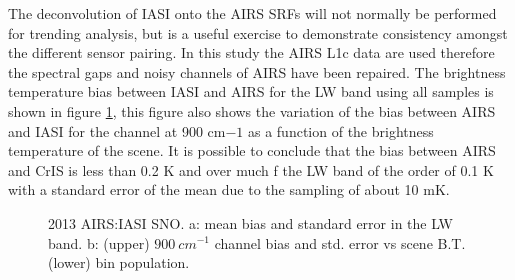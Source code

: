 \documentclass[twocolumn,10pt]{article}
\begin{document}
The deconvolution of IASI onto the AIRS SRFs will not normally be performed for trending analysis, but is a useful exercise to demonstrate consistency amongst the different sensor pairing. In this study the AIRS L1c data are used therefore the spectral gaps and noisy channels of AIRS have been repaired.
The brightness temperature bias between IASI and AIRS for the LW band using all samples is shown in figure \ref{fig:Z1}, this figure also shows the variation of the bias between AIRS and IASI for the channel at 900 cm${-1}$ as a function of the brightness temperature of the scene. It is possible to conclude that the bias between AIRS and CrIS is less than 0.2 K and over much f the LW band of the order of 0.1 K with a standard error of the mean due to the sampling of about 10 mK.

\begin{figure}[htb]
  \centering
\caption{
  2013 AIRS:IASI SNO. a:  mean bias and standard error in the LW band. b: (upper) $900\ cm^{-1}$ channel bias and std. error vs scene B.T. (lower) bin population.}
\label{fig:Z1}
\end{figure}


\end{document}
